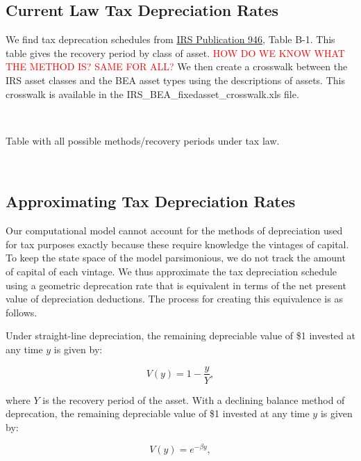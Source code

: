 \documentclass[article,11pt,letterpaper,fleqn]{article}
\theoremstyle{definition}
\numberwithin{equation}{section}
\begin{document}
\subsection{Current Law Tax Depreciation Rates}
\label{sec:tax_depr_rates}

We find tax deprecation schedules from \href{http://www.irs.gov/pub/irs-pdf/p946.pdf}{IRS Publication 946}, Table B-1.   This table gives the recovery period by class of asset.   \textcolor{red}{HOW DO WE KNOW WHAT THE METHOD IS?  SAME FOR ALL?}  We then create a crosswalk between the IRS asset classes and the BEA asset types using the descriptions of assets.  This crosswalk is available in the IRS\_BEA\_fixedasset\_crosswalk.xls file.  

\ \\
\begin{center}
Table with all possible methods/recovery periods under tax law.
\end{center}
\ \\


\subsection{Approximating Tax Depreciation Rates}
\label{sec:approx_tax_depr_rates}

Our computational model cannot account for the methods of depreciation used for tax purposes exactly because these require knowledge the vintages of capital.  To keep the state space of the model parsimonious, we do not track the amount of capital of each vintage.  We thus approximate the tax depreciation schedule using a geometric deprecation rate that is equivalent in terms of the net present value of depreciation deductions.  The process for creating this equivalence is as follows.  

Under straight-line depreciation, the remaining depreciable value of \$1 invested at any time $y$ is given by: 

\begin{equation}
V(y) =  1-\frac{y}{Y}, 
\end{equation}

\noindent\noindent where $Y$ is the recovery period of the asset.  With a declining balance method of deprecation, the remaining depreciable value of \$1 invested at any time $y$ is given by:

\begin{equation}
V(y) =  e^{-\beta y}, 
\end{equation}
\end{document}
